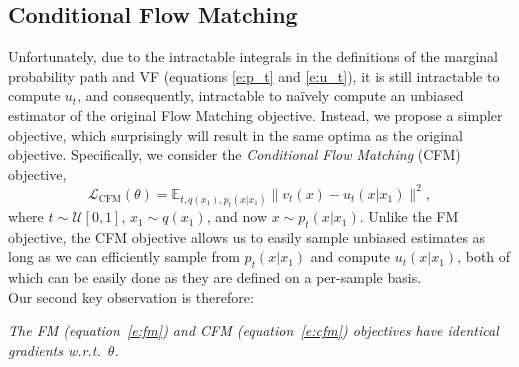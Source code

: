 \documentclass{article}
\newcommand{\CFM}{\scriptscriptstyle \text{CFM}}
\newtheorem{theorem}{Theorem}
\def\eqref#1{equation~\ref{#1}}
\def\gU{{\mathcal{U}}}
\begin{document}
\subsection{Conditional Flow Matching} Unfortunately, due to the intractable integrals in the definitions of the marginal probability path and VF (equations \ref{e:p_t} and \ref{e:u_t}), it is still intractable to compute $u_t$, and consequently, intractable to na\"ively compute an unbiased estimator of the original Flow Matching objective.
%
Instead, we propose a simpler objective, which surprisingly will result in the same optima as the original objective. 
Specifically, we consider the \emph{Conditional Flow Matching} (CFM) objective,
\begin{equation}\label{e:cfm}
    \mathcal{L}_{\CFM}(\theta) = \mathbb{E}_{t,q(x_1),p_t(x\vert x_1)} \big\| v_t(x) - u_t(x\vert x_1) \big\|^2,
\end{equation}
where $t\sim \gU[0,1]$, $x_1\sim q(x_1)$, and now $x\sim p_t(x|x_1)$. 
Unlike the FM objective, the CFM objective allows us to easily sample unbiased estimates as long as we can efficiently sample from $p_t(x|x_1)$ and compute $u_t(x|x_1)$, both of which can be easily done as they are defined on a per-sample basis.\\
Our second key observation is therefore:
\vspace{-0.5em}
\begin{center}			%
    \colorbox{mygray} {		%
      \begin{minipage}{0.977\linewidth} 	%
       \centering
        \emph{The FM (\eqref{e:fm}) and CFM (\eqref{e:cfm}) objectives have identical gradients w.r.t.~$\theta$.}
      \end{minipage}}			%
\end{center}
\end{document}
